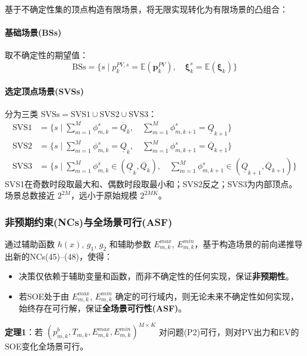 \documentclass[11pt]{ctexart}
\begin{document}
基于不确定性集的顶点构造有限场景，将无限实现转化为有限场景的凸组合：

\paragraph{基础场景(BSs)} 取不确定性的期望值：
\begin{equation}
    \text{BSs} = \{s \mid p_{k}^{PV,s} = \mathbb{E}(\boldsymbol{p}_k^{PV}), \quad \boldsymbol{\xi}_k^s = \mathbb{E}(\boldsymbol{\xi}_k)\}
\end{equation}

\paragraph{选定顶点场景(SVSs)} 分为三类 $\text{SVSs} = \text{SVS1} \cup \text{SVS2} \cup \text{SVS3}$：
\begin{align}
    \text{SVS1} &= \{s \mid \textstyle\sum_{m=1}^{M} \phi_{m,k}^s = \overline{Q}_k, \quad \sum_{m=1}^{M} \phi_{m,k+1}^s = \underline{Q}_{k+1}\} \\
    \text{SVS2} &= \{s \mid \textstyle\sum_{m=1}^{M} \phi_{m,k}^s = \underline{Q}_k, \quad \sum_{m=1}^{M} \phi_{m,k+1}^s = \overline{Q}_{k+1}\} \\
    \text{SVS3} &= \{s \mid \textstyle\sum_{m=1}^{M} \phi_{m,k}^s \in (\underline{Q}_k, \overline{Q}_k), \quad \sum_{m=1}^{M} \phi_{m,k+1}^s \in (\underline{Q}_{k+1}, \overline{Q}_{k+1})\}
\end{align}
SVS1在奇数时段取最大和、偶数时段取最小和；SVS2反之；SVS3为内部顶点。场景总数接近 $2^{2M}$，远小于原始规模 $2^{2MK}$。

\subsubsection{非预期约束(NCs)与全场景可行(ASF)}

通过辅助函数 $h(x)$, $g_1$, $g_2$ 和辅助参数 $E_{m,k}^{max}$, $E_{m,k}^{min}$，基于构造场景的前向递推导出新的NCs(45)--(48)，使得：
\begin{itemize}[leftmargin=2em]
    \item 决策仅依赖于辅助变量和函数，而非不确定性的任何实现，保证\textbf{非预期性}。
    \item 若SOE处于由 $E_{m,k}^{max}$, $E_{m,k}^{min}$ 确定的可行域内，则无论未来不确定性如何实现，始终存在可行解，保证\textbf{全场景可行性(ASF)}。
\end{itemize}

\textbf{定理1}：若 $(p_{m,k}^b, T_{m,k}, E_{m,k}^{max}, E_{m,k}^{min})^{M \times K}$ 对问题(P2)可行，则对PV出力和EV的SOE变化全场景可行。
\end{document}

